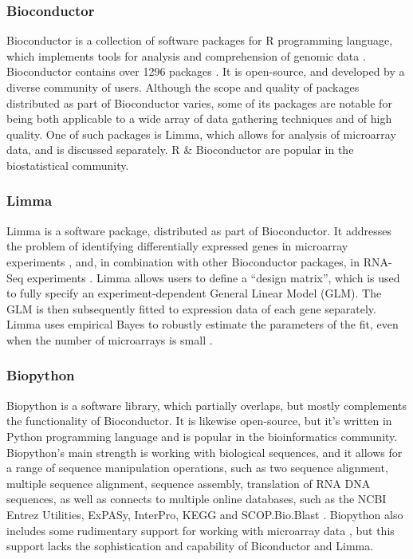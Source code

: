 \subsubsection{Bioconductor}

Bioconductor is a collection of software packages for R programming language, which implements tools for analysis and comprehension of genomic data \parencite{Huber2017}. Bioconductor contains over 1296 packages \parencite{Bioconductor}. It is open-source, and developed by a diverse community of users. Although the scope and quality of packages distributed as part of Bioconductor varies, some of its packages are notable for being both applicable to a wide array of data gathering techniques and of high quality. One of such packages is Limma, which allows for analysis of microarray data, and is discussed separately. R \& Bioconductor are popular in the biostatistical community.

\subsubsection{Limma}

Limma is a software package, distributed as part of Bioconductor. It addresses the problem of identifying differentially expressed genes in microarray experiments \parencite{Smyth2004}, and, in combination with other Bioconductor packages, in RNA-Seq experiments \parencite{Law2016}. Limma allows users to define a ``design matrix'', which is used to fully specify an experiment-dependent General Linear Model (GLM). The GLM is then subsequently fitted to expression data of each gene separately. Limma uses empirical Bayes to robustly estimate the parameters of the fit, even when the number of microarrays is small \parencite{Smyth2004}.

\subsubsection{Biopython}

Biopython is a software library, which partially overlaps, but mostly complements the functionality of Bioconductor. It is likewise open-source, but it's written in Python programming language and is popular in the bioinformatics community. Biopython's main strength is working with biological sequences, and it allows for a range of sequence manipulation operations, such as two sequence alignment, multiple sequence alignment, sequence assembly, translation of RNA  DNA sequences, as well as connects to multiple online databases, such as the NCBI Entrez Utilities, ExPASy, InterPro, KEGG and SCOP.Bio.Blast \parencite{Cock2009}. Biopython also includes some rudimentary support for working with microarray data \parencite{Zuzan2004,Kurkiewicz2016}, but this support lacks the sophistication and capability of Biconductor and Limma.

